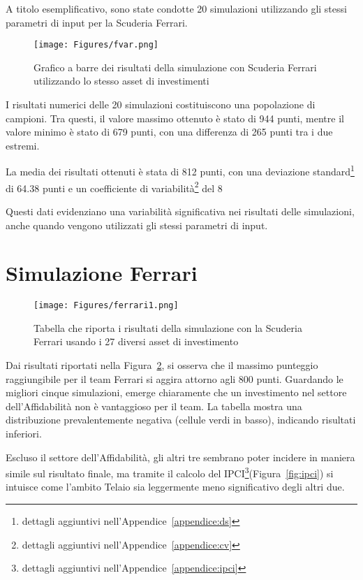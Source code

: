 A titolo esemplificativo, sono state condotte 20 simulazioni utilizzando gli stessi parametri di input per la Scuderia Ferrari.
 
\begin{figure}[h]
    \centering
    \texttt{[image: Figures/fvar.png]}
    \caption{Grafico a barre dei risultati della simulazione con Scuderia Ferrari utilizzando lo stesso asset di investimenti}
    \label{fig:ferrari}
\end{figure}

I risultati numerici delle 20 simulazioni costituiscono una popolazione di campioni. Tra questi, il valore massimo ottenuto è stato di 944 punti, mentre il valore minimo è stato di 679 punti, con una differenza di 265 punti tra i due estremi.

La media dei risultati ottenuti è stata di 812 punti, con una deviazione standard\footnote{dettagli aggiuntivi nell'Appendice~\ref{appendice:ds}} di 64.38 punti e un coefficiente di variabilità\footnote{dettagli aggiuntivi nell'Appendice~\ref{appendice:cv}} del 8%

Questi dati evidenziano una variabilità significativa nei risultati delle simulazioni, anche quando vengono utilizzati gli stessi parametri di input.



\newpage
\section{Simulazione Ferrari}

\begin{figure}[h]
    \centering
    \texttt{[image: Figures/ferrari1.png]} 
    \caption{Tabella che riporta i risultati della simulazione con la Scuderia Ferrari usando i 27 diversi asset di investimento}
    \label{fig:ferrari_assets}
\end{figure}

Dai risultati riportati nella Figura~\ref{fig:ferrari_assets}, si osserva che il massimo punteggio raggiungibile per il team Ferrari si aggira attorno agli 800 punti. Guardando le migliori cinque simulazioni, emerge chiaramente che un investimento nel settore dell’Affidabilità non è vantaggioso per il team. La tabella mostra una distribuzione prevalentemente negativa (cellule verdi in basso), indicando risultati inferiori.

Escluso il settore dell’Affidabilità, gli altri tre sembrano poter incidere in maniera simile sul risultato finale, ma tramite il calcolo del IPCI\footnote{dettagli aggiuntivi nell'Appendice~\ref{appendice:ipci}}(Figura~\ref{fig:ipci}) si intuisce come l’ambito Telaio sia leggermente meno significativo degli altri due. 


